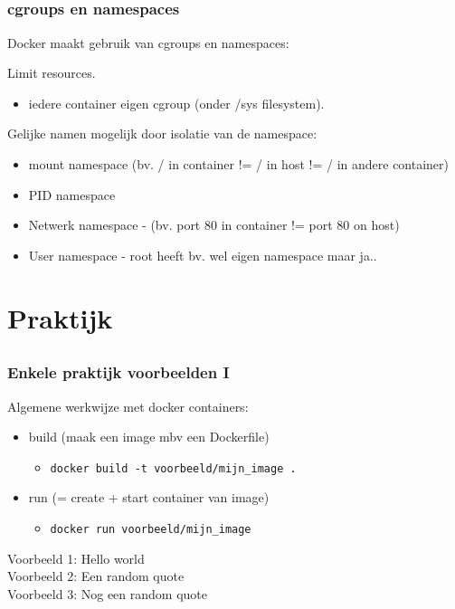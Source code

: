 \subsection{}
\begin{styleframe}
    \frametitle{cgroups en namespaces}
Docker maakt gebruik van cgroups en namespaces:
\pause
\begin{description}[namespacesbla]
	\item[cgroups] Limit resources.
	\pause
	\begin{itemize}
		\item iedere container eigen cgroup (onder /sys filesystem).
	\end{itemize}
	\pause
	\item[namespaces] Gelijke namen mogelijk door isolatie van de namespace:
	\begin{itemize}
		\pause
		\item mount namespace (bv. / in container != / in host != / in andere container)
		\pause
		\item PID namespace
		\pause
		\item Netwerk namespace - (bv. port 80 in container != port 80 on host)
		\pause
		\item User namespace - root heeft bv. wel eigen namespace maar ja.. 
	\end{itemize}
\end{description}
\end{styleframe}

\section{Praktijk}
\subsection{}
\begin{styleframefrag}
    \frametitle{Enkele praktijk voorbeelden I}
Algemene werkwijze met docker containers:
\begin{itemize}
	\pause
	\item build (maak een image mbv een Dockerfile)
	\begin{itemize}
		\pause
		\item \verb!docker build -t voorbeeld/mijn_image .!
	\end{itemize}
	\pause
	\item run (= create + start container van image)
	\begin{itemize}
		\pause
		\item \verb!docker run voorbeeld/mijn_image!
	\end{itemize}
\end{itemize}
\pause
Voorbeeld 1: Hello world\\
\pause
Voorbeeld 2: Een random quote\\
\pause
Voorbeeld 3: Nog een random quote\\
\end{styleframefrag}

